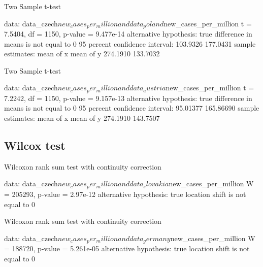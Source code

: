 \documentclass[a4paper, 12pt]{article}
\begin{document}
\clearpage

\begin{Schunk}
\begin{Soutput}
	Two Sample t-test

data:  data_czech$new_cases_per_million and data_poland$new_cases_per_million
t = 7.5404, df = 1150, p-value = 9.477e-14
alternative hypothesis: true difference in means is not equal to 0
95 percent confidence interval:
 103.9326 177.0431
sample estimates:
mean of x mean of y 
 274.1910  133.7032 
\end{Soutput}
\end{Schunk}

\begin{Schunk}
\begin{Soutput}
	Two Sample t-test

data:  data_czech$new_cases_per_million and data_austria$new_cases_per_million
t = 7.2242, df = 1150, p-value = 9.157e-13
alternative hypothesis: true difference in means is not equal to 0
95 percent confidence interval:
  95.01377 165.86690
sample estimates:
mean of x mean of y 
 274.1910  143.7507 
\end{Soutput}
\end{Schunk}

\subsection{Wilcox test}

\begin{Schunk}
\begin{Soutput}
	Wilcoxon rank sum test with continuity correction

data:  data_czech$new_cases_per_million and data_slovakia$new_cases_per_million
W = 205293, p-value = 2.97e-12
alternative hypothesis: true location shift is not equal to 0
\end{Soutput}
\end{Schunk}

\begin{Schunk}
\begin{Soutput}
	Wilcoxon rank sum test with continuity correction

data:  data_czech$new_cases_per_million and data_germany$new_cases_per_million
W = 188720, p-value = 5.261e-05
alternative hypothesis: true location shift is not equal to 0
\end{Soutput}
\end{Schunk}

\clearpage
\end{document}
